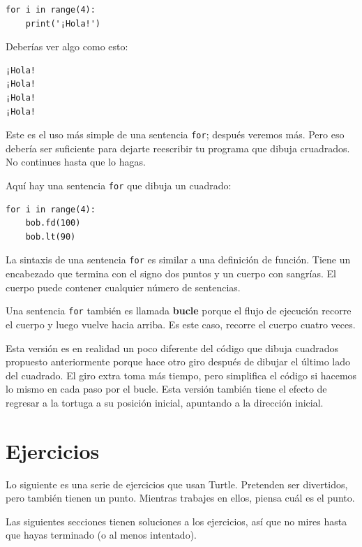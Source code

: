 \documentclass[10pt]{book}
\begin{document}
\begin{verbatim}
for i in range(4):
    print('¡Hola!')
\end{verbatim}
%
Deberías ver algo como esto:

\begin{verbatim}
¡Hola!
¡Hola!
¡Hola!
¡Hola!
\end{verbatim}
%
Este es el uso más simple de una sentencia {\tt for}; después veremos
más.  Pero eso debería ser suficiente para dejarte reescribir tu
programa que dibuja cruadrados.  No continues hasta que lo hagas.

Aquí hay una sentencia {\tt for} que dibuja un cuadrado:

\begin{verbatim}
for i in range(4):
    bob.fd(100)
    bob.lt(90)
\end{verbatim}
%
La sintaxis de una sentencia {\tt for} es similar a una definición
de función.  Tiene un encabezado que termina con el signo dos puntos y un cuerpo
con sangrías.  El cuerpo puede contener cualquier número de sentencias.

Una sentencia {\tt for} también es llamada {\bf bucle} porque
el flujo de ejecución recorre el cuerpo y luego vuelve
hacia arriba.  Es este caso, recorre el cuerpo cuatro veces.

Esta versión es en realidad un poco diferente del código
que dibuja cuadrados propuesto anteriormente porque hace otro giro después
de dibujar el último lado del cuadrado.  El giro extra toma
más tiempo, pero simplifica el código si hacemos lo mismo
en cada paso por el bucle.  Esta versión también tiene el efecto
de regresar a la tortuga a su posición inicial, apuntando a
la dirección inicial.

\section{Ejercicios}

Lo siguiente es una serie de ejercicios que usan Turtle.  Pretenden
ser divertidos, pero también tienen un punto.  Mientras trabajes en
ellos, piensa cuál es el punto.

Las siguientes secciones tienen soluciones a los ejercicios, así que
no mires hasta que hayas terminado (o al menos intentado).
\end{document}

